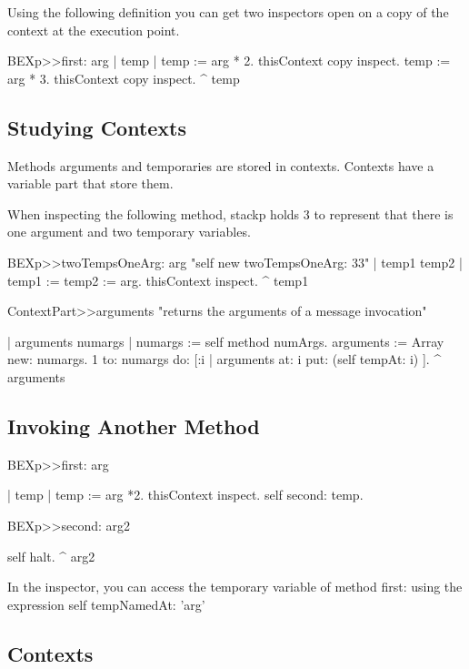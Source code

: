 \documentclass[a4paper,10pt,twoside]{book}
\begin{document}
Using the following definition you can get two inspectors open on a copy of the context
at the execution point. 
\begin{code}
BEXp>>first: arg
	| temp | 	
	temp := arg * 2.
	thisContext copy inspect.
	temp := arg * 3.
	thisContext copy inspect.
	^ temp
\end{code}

\subsection{Studying Contexts}
Methods arguments and temporaries are stored in contexts. Contexts have a variable part that 
store them. 

When inspecting the following method, stackp holds 3 to represent that there is one argument
and two temporary variables.

\begin{code}{}
BEXp>>twoTempsOneArg: arg
	"self new twoTempsOneArg: 33"
	| temp1 temp2 | 	
	temp1 := temp2 := arg.
	thisContext inspect.
	^ temp1
\end{code}


\begin{code}{}
ContextPart>>arguments
	"returns the arguments of a message invocation"
	
	| arguments numargs |
	numargs :=  self method numArgs.
	arguments := Array new: numargs.
	1 to: numargs do: [:i | arguments at: i put: (self tempAt: i) ].
	^ arguments
\end{code}






\subsection{Invoking Another Method}
\begin{code}{}
BEXp>>first: arg

	| temp | 	
	temp := arg *2.
	thisContext inspect.
	self second: temp.

BEXp>>second: arg2
	
	self halt.
	^ arg2
\end{code}

In the inspector, you can access the temporary variable of method first: using the expression self tempNamedAt: 'arg'







\subsection{Contexts}
\end{document}
